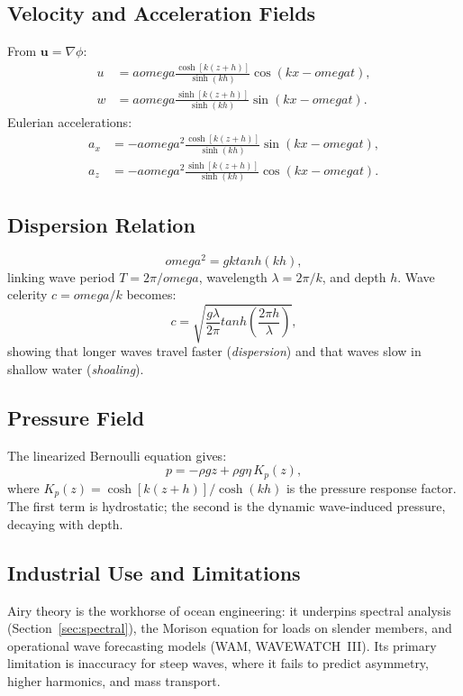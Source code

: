 \documentclass[journal,10pt,twocolumn]{IEEEtran}
\def\omega{omega}%
\def\tanh{tanh}%
\begin{document}
\subsection{Velocity and Acceleration Fields}
From $\mathbf{u}=\nabla\phi$:
\begin{align}
  u &= a\omega\frac{\cosh[k(z+h)]}{\sinh(kh)}\cos(kx-\omega t), \\
  w &= a\omega\frac{\sinh[k(z+h)]}{\sinh(kh)}\sin(kx-\omega t).
\end{align}
Eulerian accelerations:
\begin{align}
  a_x &= -a\omega^2\frac{\cosh[k(z+h)]}{\sinh(kh)}\sin(kx-\omega t), \\
  a_z &= -a\omega^2\frac{\sinh[k(z+h)]}{\sinh(kh)}\cos(kx-\omega t).
\end{align}

\subsection{Dispersion Relation}
\begin{equation}
  \omega^2 = gk\tanh(kh),
  \label{eq:dispersion}
\end{equation}
linking wave period $T=2\pi/\omega$, wavelength $\lambda=2\pi/k$, and depth $h$.
Wave celerity $c=\omega/k$ becomes:
\begin{equation}
  c = \sqrt{\frac{g\lambda}{2\pi}\tanh\!\left(\frac{2\pi h}{\lambda}\right)},
\end{equation}
showing that longer waves travel faster (\emph{dispersion}) and that waves slow in
shallow water (\emph{shoaling}).

\subsection{Pressure Field}
The linearized Bernoulli equation gives:
\begin{equation}
  p = -\rho gz + \rho g\eta\,K_p(z),
  \label{eq:airypressure}
\end{equation}
where $K_p(z)=\cosh[k(z+h)]/\cosh(kh)$ is the pressure response factor.
The first term is hydrostatic; the second is the dynamic wave-induced pressure,
decaying with depth.

\subsection{Industrial Use and Limitations}
Airy theory is the workhorse of ocean engineering:
it underpins spectral analysis (Section~\ref{sec:spectral}), the Morison equation for
loads on slender members, and operational wave forecasting models (WAM, WAVEWATCH~III).
Its primary limitation is inaccuracy for steep waves, where it fails to predict
asymmetry, higher harmonics, and mass transport.
\end{document}
